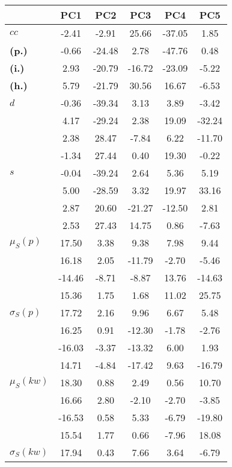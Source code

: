 \begin{table}[h!]
\begin{center}
\begin{tabular}{| l || c | c | c | c | c |}\hline
 & {\bf PC1} & {\bf PC2} & {\bf PC3} & {\bf PC4} & {\bf PC5} \\\hline\hline
{\bf $cc$} & -2.41 & -2.91 & 25.66 & -37.05 & 1.85 \\
{\bf (p.)} & -0.66 & -24.48 & 2.78 & -47.76 & 0.48 \\
{\bf (i.)} & 2.93 & -20.79 & -16.72 & -23.09 & -5.22 \\
{\bf (h.)} & 5.79 & -21.79 & 30.56 & 16.67 & -6.53 \\\hline
{\bf $d$} & -0.36 & -39.34 & 3.13 & 3.89 & -3.42 \\
{\bf } & 4.17 & -29.24 & 2.38 & 19.09 & -32.24 \\
{\bf } & 2.38 & 28.47 & -7.84 & 6.22 & -11.70 \\
{\bf } & -1.34 & 27.44 & 0.40 & 19.30 & -0.22 \\\hline
{\bf $s$} & -0.04 & -39.24 & 2.64 & 5.36 & 5.19 \\
{\bf } & 5.00 & -28.59 & 3.32 & 19.97 & 33.16 \\
 & 2.87  & 20.60  & -21.27  & -12.50  & 2.81 \\
 & 2.53  & 27.43  & 14.75  & 0.86  & -7.63 \\\hline
$\mu_S(p)$ & 17.50  & 3.38  & 9.38  & 7.98  & 9.44 \\
 & 16.18  & 2.05  & -11.79  & -2.70  & -5.46 \\
 & -14.46  & -8.71  & -8.87  & 13.76  & -14.63 \\
 & 15.36  & 1.75  & 1.68  & 11.02  & 25.75 \\\hline
$\sigma_S(p)$ & 17.72  & 2.16  & 9.96  & 6.67  & 5.48 \\
 & 16.25  & 0.91  & -12.30  & -1.78  & -2.76 \\
 & -16.03  & -3.37  & -13.32  & 6.00  & 1.93 \\
 & 14.71  & -4.84  & -17.42  & 9.63  & -16.79 \\\hline
$\mu_S(kw)$ & 18.30  & 0.88  & 2.49  & 0.56  & 10.70 \\
 & 16.66  & 2.80  & -2.10  & -2.70  & -3.85 \\
 & -16.53  & 0.58  & 5.33  & -6.79  & -19.80 \\
 & 15.54  & 1.77  & 0.66  & -7.96  & 18.08 \\\hline
$\sigma_S(kw)$ & 17.94  & 0.43  & 7.66  & 3.64  & -6.79 \\

\end{tabular}
\end{center}
\end{table}

